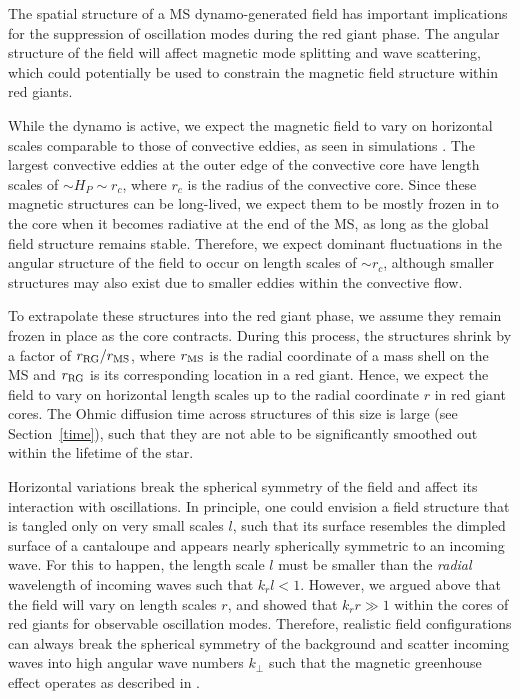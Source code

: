 The spatial structure of a MS dynamo-generated field has important implications for the suppression of oscillation modes during the red giant phase.
The angular structure of the field will affect magnetic mode splitting and wave scattering, which could potentially be used to constrain the magnetic field structure within red giants.

While the dynamo is active, we expect the magnetic field to vary on horizontal scales comparable to those of convective eddies, as seen in simulations \citep{Featherstone_2009}. The largest convective eddies at the outer edge of the convective core have length scales of $\sim \! H_P \sim \! r_c$, where $r_c$ is the radius of the convective core. Since these magnetic structures can be long-lived, we expect them to be mostly frozen in to the core when it becomes radiative at the end of the MS, as long as the global field structure remains stable. Therefore, we expect dominant fluctuations in the angular structure of the field to occur on length scales of $\sim \! r_c$, although smaller structures may also exist due to smaller eddies within the convective flow.

To extrapolate these structures into the red giant phase, we assume they remain frozen in place as the core contracts. During this process, the structures shrink by a factor of $r_{\rm RG}/r_{\rm MS}$, where $r_{\rm MS}$ is the radial coordinate of a mass shell on the MS and $r_{\rm RG}$ is its corresponding location in a red giant. Hence, we expect the field to vary on horizontal length scales up to the radial coordinate $r$ in red giant cores. The Ohmic diffusion time across structures of this size is large (see Section~\ref{time}), such that they are not able to be significantly smoothed out within the lifetime of the star.

Horizontal variations break the spherical symmetry of the field and affect its interaction with oscillations. In principle, one could envision a field structure that is tangled only on very small scales $l$, such that its surface resembles the dimpled surface of a cantaloupe and appears nearly spherically symmetric to an incoming wave. For this to happen, the length scale $l$ must be smaller than the {\it radial} wavelength of incoming waves such that $k_r l < 1$. However, we argued above that the field will vary on length scales $r$, and \citet{Fuller_2015} showed that $k_r r \gg 1$ within the cores of red giants for observable oscillation modes. Therefore, realistic field configurations can always break the spherical symmetry of the background and scatter incoming waves into high angular wave numbers $k_\perp$ such that the magnetic greenhouse effect operates as described in \citet{Fuller_2015}.